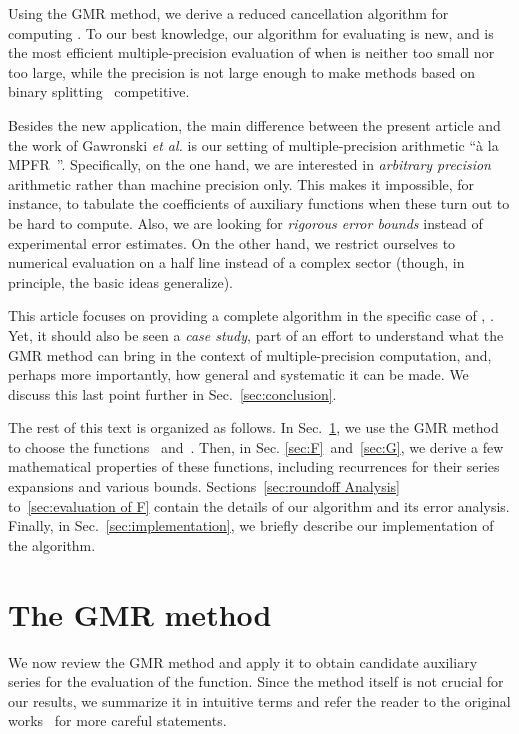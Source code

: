 \documentclass[10pt, conference]{IEEEtran}
\begin{document}
Using the GMR method, we derive a reduced cancellation algorithm for
computing .
To our best knowledge, our algorithm for evaluating  is new, and is the
most efficient multiple-precision evaluation of 
when  is neither too small nor too large, while the precision is not large
enough to make methods based on binary splitting~\cite{BrentZimmermann2010} competitive.

Besides the new application, the main difference between the
present article and the work of Gawronski {\emph{et al.}} is our setting of
multiple-precision arithmetic ``\`a la
MPFR~{\cite{FousseHanrotLefevrePelissierZimmermann2007}}''. Specifically, on
the one hand, we are interested in {\emph{arbitrary precision}} arithmetic
rather than machine precision only. This makes it impossible, for instance, to
tabulate the coefficients of auxiliary functions when these turn out to be
hard to compute. Also, we are looking for {\emph{rigorous error bounds}}
instead of experimental error estimates. On the other hand, we restrict
ourselves to numerical evaluation on a half line instead of a complex sector (though, in principle, the basic ideas generalize).

This article focuses on providing a complete algorithm in the specific
case of , . Yet, it should also be seen a
{\emph{case study}}, part of an effort to understand what the GMR method can
bring in the context of multiple-precision computation, and, perhaps more
importantly, how general and systematic it can be made. We discuss this last
point further in Sec.~\ref{sec:conclusion}.

The rest of this text is organized as follows.
In Sec.~\ref{sec:GMR}, we use the GMR method to choose the functions ~and~.
Then, in Sec. \ref{sec:F}~and~\ref{sec:G}, we derive a few mathematical properties of these functions, including recurrences for their series expansions and various bounds.
Sections~\ref{sec:roundoff Analysis} to~\ref{sec:evaluation of F} contain the details of our algorithm and its error analysis.
Finally, in Sec.~\ref{sec:implementation}, we briefly describe our implementation of the algorithm.

\section{The GMR method}
\label{sec:GMR}

We now review the GMR method and apply it to obtain candidate
auxiliary series for the evaluation of the  function. Since the
method itself is not crucial for our results, we summarize it in intuitive
terms and refer the reader to the original
works~{\cite{GawronskiMullerReinhard2007,Reinhard2008}} for more careful
statements.
\end{document}
